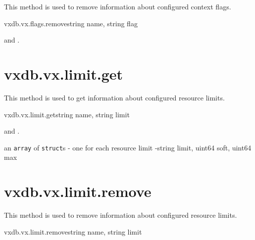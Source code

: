This method is used to remove information about configured context flags.

\begin{rpcsynopsis}{vxdb.vx.flags.remove}{string name, string flag}
\end{rpcsynopsis}

\begin{rpcaccess}
 and \rpcownerchecks.
\end{rpcaccess}

\rpcreturnnil

\rpcnoerrors


\section{vxdb.vx.limit.get}

This method is used to get information about configured resource limits.

\begin{rpcsynopsis}{vxdb.vx.limit.get}{string name, string limit}
\end{rpcsynopsis}

\begin{rpcaccess}
 and \rpcownerchecks.
\end{rpcaccess}

\begin{rpcreturncomplex}{an \texttt{array} of \texttt{struct}s - one for each
	resource limit -}{string limit, uint64 soft, uint64 max}
\end{rpcreturncomplex}

\rpcnoerrors


\section{vxdb.vx.limit.remove}

This method is used to remove information about configured resource limits.

\begin{rpcsynopsis}{vxdb.vx.limit.remove}{string name, string limit}
\end{rpcsynopsis}

